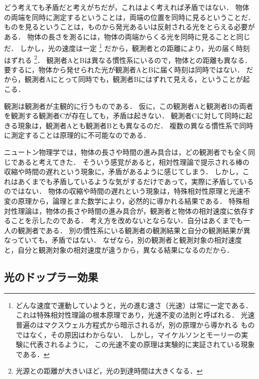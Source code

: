         どう考えても矛盾だと考えがちだが，これはよく考えれば矛盾ではない．
        物体の両端を同時に測定するということは，両端の位置を同時に見るということだ．
        ものを見るということは，ものから発光あるいは反射される光をとらえる必要がある．
        物体の長さを測るには，物体の両端からくる光を同時に見ることと同じだ．
        しかし，光の速度は一定
            \footnote{
                どんな速度で運動していようと，光の進む速さ（光速）は常に一定である．
                これは特殊相対性理論の根本原理であり，光速不変の法則と呼ばれる．
                光速普遍のはマクスウェル方程式から暗示されるが，別の原理から導かれる
                ものではなく，その原因はわからない．
                しかし，マイケルソンとモーリーの実験に代表されるように，
                この光速不変の原理は実験的に実証されている現象である．
            }
        だから，観測者との距離により，光の届く時刻はずれる
            \footnote{
                光源との距離が大きいほど，光の到達時間は大きくなる．
            }．
        観測者AとBは異なる慣性系にいるので，物体との距離も異なる．
        要するに，物体から発せられた光が観測者AとBに届く時刻は同時ではない．
        だから，観測者Aにとって同時でも，観測者Bにはずれて見える，ということが起こる．

        観測は観測者が主観的に行うものである．
        仮に，この観測者Aと観測者Bの両者を観測する観測者Cが存在しても，矛盾は起きない．
        観測者Cに対して同時に起きる現象は，観測者Aとも観測者Bとも異なるのだ．
        複数の異なる慣性系で同時に測定することは原理的に不可能なのである．

        ニュートン物理学では，物体の長さや時間の進み具合は，どの観測者でも全く同じであると考えてきた．
        そういう感覚があると，相対性理論で提示される棒の収縮や時間の遅れという現象に，矛盾があるように感じてしまう．
        しかし，これはあくまでも矛盾しているような気がするだけであって，実際に矛盾しているのではない．
        物体の収縮や時間の遅れという現象は，特殊相対性原理と光速不変の原理から，論理とまた数学により，必然的に導かれる結果である．
        特殊相対性理論は，物体の長さや時間の進み具合が，観測者と物体の相対速度に依存することを示したのである．
        考え方を改めないとならない．自分はあくまでも一人の観測者である．
        別の慣性系にいる観測者の観測結果と自分の観測結果が異なっていても，矛盾ではない．
        なぜなら，別の観測者と観測対象の相対速度と，自分と観測対象の相対速度が違うから，異なる結果になるのだから．

\subsection{光のドップラー効果}

